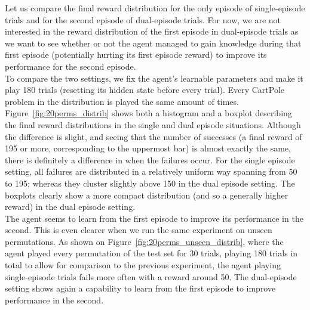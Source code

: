 Let us compare the final reward distribution for the only episode of 
single-episode trials and for the second episode of dual-episode trials.
For now, we are not interested in the reward distribution of the first episode
in dual-episode trials as we want to see whether or not the agent managed to
gain knowledge during that first episode (potentially hurting its first episode
reward) to improve its performance for the second episode.\\

To compare the two settings, we fix the agent's learnable parameters and make
it play 180 trials (resetting its hidden state before every trial). Every 
CartPole problem in the distribution is played the same amount of times. \\

Figure~\ref{fig:20perms_distrib} shows both a histogram and a boxplot describing
the final reward distributions in the single and dual episode situations. 
Although the difference is slight, and seeing that the number
of successes (a final reward of 195 or more, corresponding to the uppermost
bar) is almost exactly the same, there is definitely a difference in when the
failures occur. For the single episode setting, all failures are distributed
in a relatively uniform way spanning from 50 to 195; whereas they cluster 
slightly above 150 in the dual episode setting. The boxplots clearly show
a more compact distribution (and so a generally higher reward) in the dual
episode setting.\\

The agent seems to learn from the first episode to improve its performance in
the second. This is even clearer when we run the same experiment on unseen
permutations. As shown on Figure~\ref{fig:20perms_unseen_distrib}, where the
agent played every permutation of the test set for 30 trials, playing 180
trials in total to allow for comparison to the previous experiment, the agent
playing single-episode trials fails more often with a reward around 50. The
dual-episode setting shows again a capability to learn from the first episode
to improve performance in the second.\\

